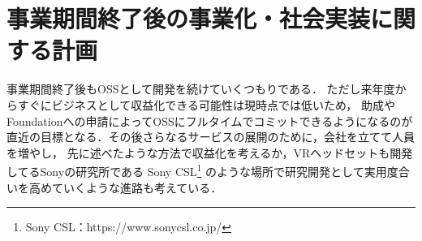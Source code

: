 \section{事業期間終了後の事業化・社会実装に関する計画}

事業期間終了後もOSSとして開発を続けていくつもりである．
ただし来年度からすぐにビジネスとして収益化できる可能性は現時点では低いため，
助成やFoundationへの申請によってOSSにフルタイムでコミットできるようになるのが
直近の目標となる．その後さらなるサービスの展開のために，会社を立てて人員を増やし，
先に述べたような方法で収益化を考えるか，VRヘッドセットも開発してるSonyの研究所である
Sony CSL\footnote{Sony CSL：https://www.sonycsl.co.jp/}
のような場所で研究開発として実用度合いを高めていくような進路も考えている．

